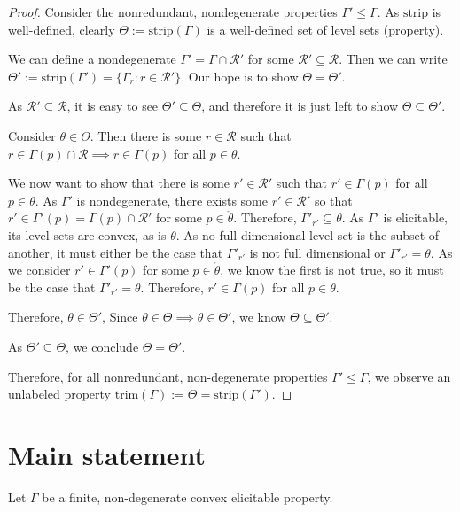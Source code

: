 \documentclass[12pt]{article}
\newcommand{\R}{\mathcal{R}}
\newcommand{\inter}[1]{\mathring{#1}}%
\newcommand{\trim}{\mathrm{trim}}
\newcommand{\strip}{\text{strip}}
\begin{document}
\begin{proof}
	
	Consider the nonredundant, nondegenerate properties $\Gamma' \leq \Gamma$.
	As $\strip$ is well-defined, clearly $\Theta := \strip(\Gamma)$ is a well-defined set of level sets (property).
	
	We can define a nondegenerate $\Gamma' = \Gamma \cap \R'$ for some $\R' \subseteq \R$.
	Then we can write $\Theta' := \strip(\Gamma') = \{\Gamma_r : r \in \R' \}$.
	Our hope is to show $\Theta = \Theta'$.
	
	As $\R' \subseteq \R$, it is easy to see  $\Theta' \subseteq \Theta$, and therefore it is just left to show $\Theta \subseteq \Theta'$.
	
	Consider $\theta \in \Theta$.
	Then there is some $r \in \R$ such that $r\in\Gamma(p)\cap \R \implies r \in \Gamma(p)$ for all $p \in \theta$.
	
	We now want to show that there is some $r' \in \R'$ such that $r' \in \Gamma(p)$ for all $p \in \theta$.
	As $\Gamma'$ is nondegenerate, there exists some $r' \in \R'$ so that $r' \in \Gamma'(p) = \Gamma(p) \cap \R'$ for some $p \in \inter{\theta}$.
	Therefore, $\Gamma'_{r'} \subseteq \theta$.
	As $\Gamma'$ is elicitable, its level sets are convex, as is $\theta$.
	As no full-dimensional level set is the subset of another, it must either be the case that $\Gamma'_{r'}$ is not full dimensional or $\Gamma'_{r'} = \theta$.
	As we consider $r' \in \Gamma'(p)$ for some $p \in \inter{\theta}$, we know the first is not true, so it must be the case that $\Gamma'_{r'} = \theta$.
	Therefore, $r' \in \Gamma(p)$ for all $p \in \theta$.
	
	Therefore, $\theta \in \Theta'$,
	Since $\theta \in \Theta \implies \theta \in \Theta'$, we know $\Theta \subseteq \Theta'$.
	
	As $\Theta' \subseteq \Theta$, we conclude $\Theta = \Theta'$.
	
	Therefore, for all nonredundant, non-degenerate properties $\Gamma' \leq \Gamma$, we observe an unlabeled property $\trim(\Gamma) := \Theta = \strip(\Gamma')$.
	
\end{proof}


\section{Main statement}

Let $\Gamma$ be a finite, non-degenerate convex elicitable property.
\end{document}
